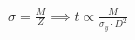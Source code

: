 \documentclass[preview]{standalone}
\begin{document}
\begin{align*}
\sigma = \frac{M}{Z} \implies t \propto \frac{M}{\sigma_y \cdot D^2}
\end{align*}
\end{document}

